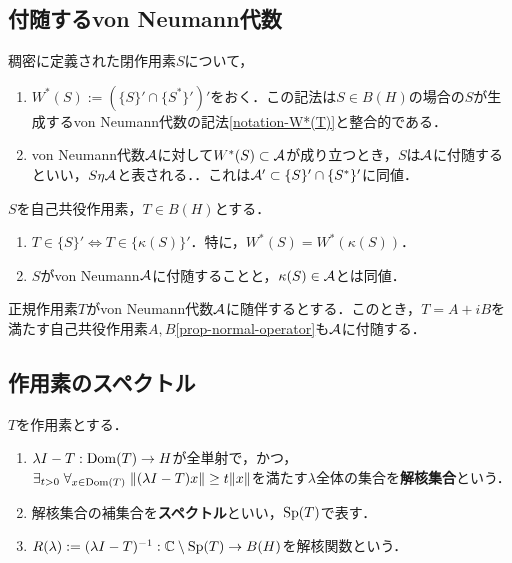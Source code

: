 \documentclass[uplatex,dvipdfmx]{jsreport}
\begin{document}
\subsection{付随するvon Neumann代数}

\begin{definition}
    稠密に定義された閉作用素$S$について，
    \begin{enumerate}
        \item $W^*(S):=(\{S\}'\cap\{S^*\}')'$をおく．この記法は$S\in B(H)$の場合の$S$が生成するvon Neumann代数の記法\ref{notation-W*(T)}と整合的である．
        \item von Neumann代数$\mathcal{A}$に対して$W^*(S)\subset\mathcal{A}$が成り立つとき，$S$は$\mathcal{A}$に付随するといい，$S\eta\mathcal{A}$と表される．．これは$\mathcal{A}'\subset\{S\}'\cap\{S^*\}'$に同値．
    \end{enumerate}
\end{definition}

\begin{lemma}
    $S$を自己共役作用素，$T\in B(H)$とする．
    \begin{enumerate}
        \item $T\in\{S\}'\Leftrightarrow T\in\{\kappa(S)\}'$．特に，$W^*(S)=W^*(\kappa(S))$．
        \item $S$がvon Neumann$\mathcal{A}$に付随することと，$\kappa(S)\in\mathcal{A}$とは同値．
    \end{enumerate}
\end{lemma}

\begin{lemma}
    正規作用素$T$がvon Neumann代数$\mathcal{A}$に随伴するとする．このとき，$T=A+iB$を満たす自己共役作用素$A,B$\ref{prop-normal-operator}も$\mathcal{A}$に付随する．
\end{lemma}

\subsection{作用素のスペクトル}

\begin{definition}
    $T$を作用素とする．
    \begin{enumerate}
        \item $\lambda I-T:\mathrm{Dom}(T)\to H$が全単射で，かつ，$\exists_{t>0}\;\forall_{x\in\mathrm{Dom}(T)}\;\|(\lambda I-T)x\|\ge t\|x\|$を満たす$\lambda$全体の集合を\textbf{解核集合}という．
        \item 解核集合の補集合を\textbf{スペクトル}といい，$\mathrm{Sp}(T)$で表す．
        \item $R(\lambda):=(\lambda I-T)^{-1}:\mathbb{C}\setminus\mathrm{Sp}(T)\to B(H)$を解核関数という．
    \end{enumerate}
\end{definition}
\end{document}

